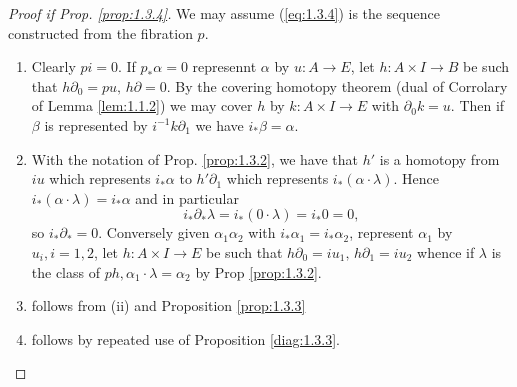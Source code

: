 \documentclass[../main]{subfiles}
\begin{document}
\begin{proof}[Proof if Prop. \ref{prop:1.3.4}]
    We may assume (\ref{eq:1.3.4}) is the sequence constructed from the fibration $p$.
    \begin{enumerate}[label=(\roman*)]
        \item Clearly $pi=0$.  If $p_*\alpha = 0$ represennt $\alpha$ by $u:A \longrightarrow E$, let $h:A \times I \longrightarrow B$ be such that $h\partial_0 = pu, \,h\partial = 0$.  By the covering homotopy theorem (dual of Corrolary of Lemma \ref{lem:1.1.2}) we may cover $h$ by $k:A \times I \longrightarrow E$ with $\partial_0 k=u$.  Then if $\beta$ is represented by $i^{-1}k\partial_1$ we have $i_*\beta = \alpha$.
        \item With the notation of Prop. \ref{prop:1.3.2}, we have that $h'$ is a homotopy from $iu$ which represents $i_*\alpha$ to $h'\partial_1$ which represents $i_*(\alpha \cdot \lambda)$.  Hence $i_*(\alpha \cdot \lambda) = i_* \alpha$ and in particular \[i_*\partial_*\lambda = i_*(0\cdot \lambda) = i_*0 = 0,\] so $i_*\partial_* = 0$.  Conversely given $\alpha_1 \alpha_2$ with $i_*\alpha_1 = i_*\alpha_2$, represent $\alpha_1$ by $u_i, i = 1,2$, let $h:A \times I \longrightarrow E$ be such that $h\partial_0 = iu_1 , \,h\partial_1 = iu_2$ whence if $\lambda$ is the class of $ph, \alpha_1 \cdot \lambda = \alpha_2$ by Prop \ref{prop:1.3.2}.
        \item follows from (ii) and Proposition \ref{prop:1.3.3}
        \item follows by repeated use of Proposition \ref{diag:1.3.3}. 
    \end{enumerate}
\end{proof}
\end{document}
